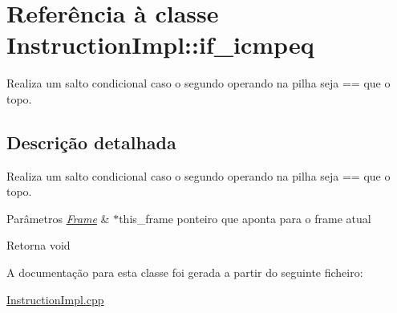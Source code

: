 \hypertarget{class_instruction_impl_1_1if__icmpeq}{}\section{Referência à classe Instruction\+Impl\+:\+:if\+\_\+icmpeq}
\label{class_instruction_impl_1_1if__icmpeq}


Realiza um salto condicional caso o segundo operando na pilha seja == que o topo.  




\subsection{Descrição detalhada}
Realiza um salto condicional caso o segundo operando na pilha seja == que o topo. 


\begin{DoxyParams}{Parâmetros}
{\em \hyperlink{struct_frame}{Frame}} & $\ast$this\+\_\+frame ponteiro que aponta para o frame atual \\
\hline
\end{DoxyParams}
\begin{DoxyReturn}{Retorna}
void 
\end{DoxyReturn}


A documentação para esta classe foi gerada a partir do seguinte ficheiro\+:\begin{DoxyCompactItemize}
\item 
\hyperlink{_instruction_impl_8cpp}{Instruction\+Impl.\+cpp}\end{DoxyCompactItemize}
